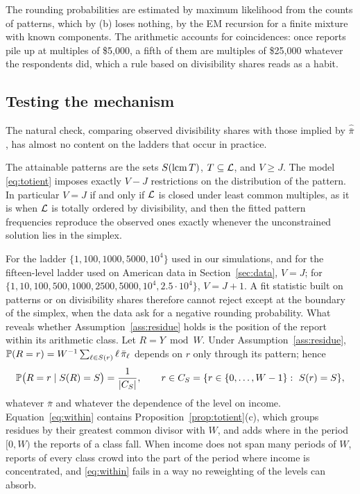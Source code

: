 The rounding probabilities are estimated by maximum likelihood from the counts of patterns, which by (b) loses nothing, by the EM recursion for a finite mixture with known components. The arithmetic accounts for coincidences: once reports pile up at multiples of \$5{,}000, a fifth of them are multiples of \$25{,}000 whatever the respondents did, which a rule based on divisibility shares reads as a habit.

\subsection{Testing the mechanism}

The natural check, comparing observed divisibility shares with those implied by $\hat{\bar\pi}$, has almost no content on the ladders that occur in practice.

\begin{proposition}\label{prop:saturation}
The attainable patterns are the sets $S(\operatorname{lcm} T)$, $T\subseteq\mathcal{L}$, and $V\ge J$. The model \eqref{eq:totient} imposes exactly $V-J$ restrictions on the distribution of the pattern. In particular $V=J$ if and only if $\mathcal{L}$ is closed under least common multiples, as it is when $\mathcal{L}$ is totally ordered by divisibility, and then the fitted pattern frequencies reproduce the observed ones exactly whenever the unconstrained solution lies in the simplex.
\end{proposition}

For the ladder $\{1,\allowbreak 100,\allowbreak 1000,\allowbreak 5000,\allowbreak 10^4\}$ used in our simulations, and for the fifteen-level ladder used on American data in Section~\ref{sec:data}, $V=J$; for $\{1,\allowbreak 10,\allowbreak 100,\allowbreak 500,\allowbreak 1000,\allowbreak 2500,\allowbreak 5000,\allowbreak 10^4,\allowbreak 2.5\cdot10^4\}$, $V=J+1$. A fit statistic built on patterns or on divisibility shares therefore cannot reject except at the boundary of the simplex, when the data ask for a negative rounding probability. What reveals whether Assumption~\ref{ass:residue} holds is the position of the report within its arithmetic class. Let $R=Y\bmod W$. Under Assumption~\ref{ass:residue}, $\mathbb{P}(R=r)=W^{-1}\sum_{\ell\in S(r)}\ell\,\bar\pi_\ell$ depends on $r$ only through its pattern; hence
\begin{equation}\label{eq:within}
\mathbb{P}\bigl(R=r\mid S(R)=S\bigr)=\frac{1}{|C_S|},\qquad r\in C_S=\{r\in\{0,\dots,W-1\}:\ S(r)=S\},
\end{equation}
whatever $\bar\pi$ and whatever the dependence of the level on income. Equation~\eqref{eq:within} contains Proposition~\ref{prop:totient}(c), which groups residues by their greatest common divisor with $W$, and adds where in the period $[0,W)$ the reports of a class fall. When income does not span many periods of $W$, reports of every class crowd into the part of the period where income is concentrated, and \eqref{eq:within} fails in a way no reweighting of the levels can absorb.

